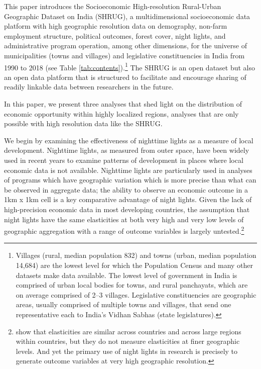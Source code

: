 \documentclass[12pt,letterpaper]{article}
\begin{document}
This paper introduces the Socioeconomic High-resolution Rural-Urban
Geographic Dataset on India (SHRUG), a multidimensional socioeconomic
data platform with high geographic resolution data on demography,
non-farm employment structure, political outcomes, forest cover, night
lights, and administrative program operation, among other dimensions,
for the universe of municipalities (towns and villages) and
legislative constituencies in India from 1990 to 2018 (see Table
\ref{tab:contents}).\footnote{Villages (rural, median population 832)
  and towns (urban, median population 14,684) are the lowest level for
  which the Population Census and many other datasets make data
  available. The lowest level of government in India is comprised of
  urban local bodies for towns, and rural panchayats, which are on
  average comprised of 2--3 villages. Legislative constituencies are
  geographic areas, usually comprised of multiple towns and villages,
  that send one representative each to India's Vidhan Sabhas (state
  legislatures).} The SHRUG is an open dataset but also an open data
platform that is structured to facilitate and encourage sharing of
readily linkable data between researchers in the future.

In this paper, we present three analyses that shed light on the
distribution of economic opportunity within highly localized regions,
analyses that are only possible with high resolution data like the
SHRUG.

We begin by examining the effectiveness of nighttime lights as a
measure of local development. Nighttime lights, as measured from outer
space, have been widely used in recent years to examine patterns of
development in places where local economic data is not
available. Nighttime lights are particularly used in analyses of
programs which have geographic variation which is more precise than
what can be observed in aggregate data; the ability to observe an
economic outcome in a 1km x 1km cell is a key comparative advantage of
night lights. Given the lack of high-precision economic data in most
developing countries, the assumption that night lights have the same
elasticities at both very high and very low levels of geographic
aggregation with a range of outcome variables is largely
untested.\footnote{ show that elasticities
  are similar across countries and across large regions within
  countries, but they do not measure elasticities at finer geographic
  levels. And yet the primary use of night lights in research is
  precisely to generate outcome variables at very high geographic
  resolution.}
\end{document}
